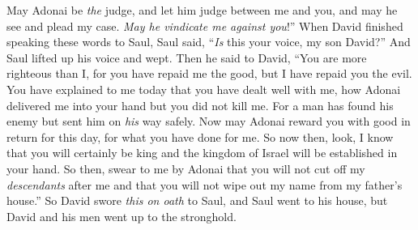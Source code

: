 \begin{biblechapter}
\verse May Adonai be \textit{the} judge, and let him judge between me and you, and may he see and plead my case. \textit{May he vindicate me against you}!”
\verse When David finished speaking these words to Saul, Saul said, “\textit{Is} this your voice, my son David?” And Saul lifted up his voice and wept.
\verse Then he said to David, “You are more righteous than I, for you have repaid me the good, but I have repaid you the evil.
\verse You have explained to me today that you have dealt well with me, how Adonai delivered me into your hand but you did not kill me.
\verse For a man has found his enemy but sent him on \textit{his} way safely. Now may Adonai reward you with good in return for this day, for what you have done for me.
\verse So now then, look, I know that you will certainly be king and the kingdom of Israel will be established in your hand.
\verse So then, swear to me by Adonai that you will not cut off my \textit{descendants} after me and that you will not wipe out my name from my father’s house.”
\verse So David swore \textit{this on oath} to Saul, and Saul went to his house, but David and his men went up to the stronghold.
\end{biblechapter}

